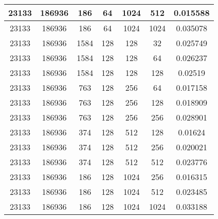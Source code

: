 \documentclass[9pt]{article}
\begin{document}
\begin{tabular}{|c|c|c|c|c|c|c| }
\hline
23133  & 186936  & 186  & 64  & 1024  & 512  & 0.015588 \\
\hline
23133  & 186936  & 186  & 64  & 1024  & 1024  & 0.035078 \\
\hline
23133  & 186936  & 1584  & 128  & 128  & 32  & 0.025749 \\
\hline
23133  & 186936  & 1584  & 128  & 128  & 64  & 0.026237 \\
\hline
23133  & 186936  & 1584  & 128  & 128  & 128  & 0.02519 \\
\hline
23133  & 186936  & 763  & 128  & 256  & 64  & 0.017158 \\
\hline
23133  & 186936  & 763  & 128  & 256  & 128  & 0.018909 \\
\hline
23133  & 186936  & 763  & 128  & 256  & 256  & 0.028901 \\
\hline
23133  & 186936  & 374  & 128  & 512  & 128  & 0.01624 \\
\hline
23133  & 186936  & 374  & 128  & 512  & 256  & 0.020021 \\
\hline
23133  & 186936  & 374  & 128  & 512  & 512  & 0.023776 \\
\hline
23133  & 186936  & 186  & 128  & 1024  & 256  & 0.016315 \\
\hline
23133  & 186936  & 186  & 128  & 1024  & 512  & 0.023485 \\
\hline
23133  & 186936  & 186  & 128  & 1024  & 1024  & 0.033188 \\
\hline
\end{tabular}
 
\end{document}
